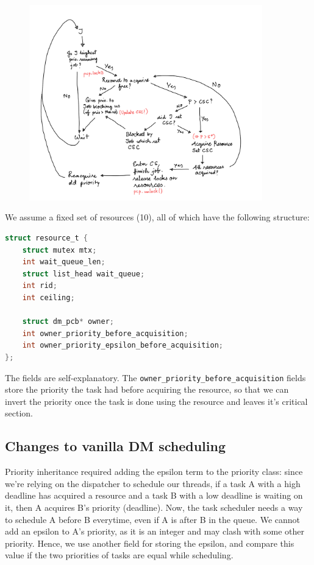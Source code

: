 \documentclass[12pt]{article}
\begin{document}
\begin{figure}[!htbp]
    \centering
    \includegraphics[width=0.9\textwidth]{pcp.jpeg}
\end{figure}

We assume a fixed set of resources (10), all of which have the following 
structure:

\begin{lstlisting}[language=C]
struct resource_t {
	struct mutex mtx;
	int wait_queue_len;
	struct list_head wait_queue;
	int rid;
	int ceiling;

	struct dm_pcb* owner;
	int owner_priority_before_acquisition;
	int owner_priority_epsilon_before_acquisition;
};
\end{lstlisting}

The fields are self-explanatory. The \texttt{owner\_priority\_before\_acquisition} fields 
store the priority the task had before acquiring the resource, so that we can 
invert the priority once the task is done using the resource and leaves it's 
critical section.

\subsection{Changes to vanilla DM scheduling}

Priority inheritance required adding the epsilon term to the priority class:
since we're relying on the dispatcher to schedule our threads, if a task A with
a high deadline has acquired a resource and a task B with a low deadline is 
waiting on it, then A acquires B's priority (deadline). Now, the task scheduler 
needs a way to schedule A before B everytime, even if A is after B in the queue.
We cannot add an epsilon to A's priority, as it is an integer and may clash with
some other priority. Hence, we use another field for storing the epsilon, and
compare this value if the two priorities of tasks are equal while scheduling.
\end{document}

